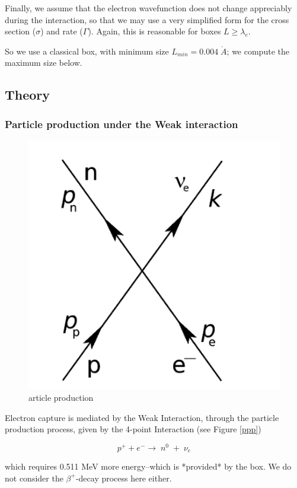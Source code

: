 \documentclass[11pt]{amsart}
\begin{document}
Finally, we assume that the electron wavefunction does not change appreciably during the interaction, so that we may use a very simplified form for the cross section ($\sigma$) and rate ($\Gamma$).  Again, this is reasonable for boxes $L\ge\lambda_{e}$.

So we use a classical box, with minimum size $L_{min}=0.004\;\mathring{A}$; we compute the maximum size below.

\subsection{Theory}

\subsubsection{Particle production under the Weak interaction}

\begin{figure}
   \includegraphics[scale=0.25]{img/feynman.png}
   \caption{article production}
  \label{fig:ppp}
\end{figure}

Electron capture is mediated by the Weak Interaction, through the particle production process, given by the 4-point Interaction (see Figure \ref{ppp})

$$p^{+}+e^{-}\rightarrow\;n^{0}\;+\;\nu{_e}$$

which requires 0.511 MeV more energy--which is *provided* by the box. We do not consider the $\beta^{+}$-decay process here either.
\end{document}

